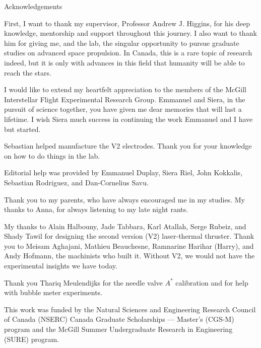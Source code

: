\begin{plainchp}{Acknowledgements}
    
    First, I want to thank my supervisor, Professor Andrew J. Higgins, for his deep knowledge, mentorship and support throughout this journey. I also want to thank him for giving me, and the lab, the singular opportunity to pursue graduate studies on advanced space propulsion. In Canada, this is a rare topic of research indeed, but it is only with advances in this field that humanity will be able to reach the stars.

    I would like to extend my heartfelt appreciation to the members of the McGill Interstellar Flight Experimental Research Group. Emmanuel and Siera, in the pursuit of science together, you have given me dear memories that will last a lifetime. I wish Siera much success in continuing the work Emmanuel and I have but started.

    Sebastian helped manufacture the V2 electrodes. Thank you for your knowledge on how to do things in the lab.

    Editorial help was provided by Emmanuel Duplay, Siera Riel, John Kokkalis, Sebastian Rodriguez, and Dan-Cornelius Savu.
    
    Thank you to my parents, who have always encouraged me in my studies. My thanks to Anna, for always listening to my late night rants.

    My thanks to Alain Halbouny, Jade Tabbara, Karl Atallah, Serge Rubeiz, and Shady Tawil for designing the second version (V2) laser-thermal thruster. Thank you to Meisam Aghajani, Mathieu Beauchesne, Ramnarine Harihar (Harry), and Andy Hofmann, the machinists who built it. Without V2, we would not have the experimental insights we have today.

    Thank you Thariq Meulendijks for the needle valve $A^*$ calibration and for help with bubble meter experiments.

    This work was funded by the Natural Sciences and Engineering Research Council of Canada (NSERC) Canada Graduate Scholarships — Master’s (CGS-M) program and the McGill Summer Undergraduate Research in Engineering (SURE) program.

\end{plainchp}